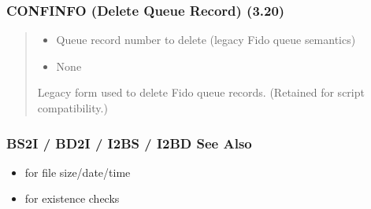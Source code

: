 \documentclass[letterpaper,10pt,english]{sphinxmanual}
\begin{document}
\subsubsection{CONFINFO (Delete Queue Record) (3.20)}
\label{\detokenize{ppl:id4}}\begin{quote}

\sphinxAtStartPar
{}
\begin{description}
\begin{itemize}
\item {} 
\sphinxAtStartPar
{} \textendash{} Queue record number to delete (legacy Fido queue semantics)

\end{itemize}

\begin{itemize}
\item {} 
\sphinxAtStartPar
None

\end{itemize}

\sphinxAtStartPar
Legacy form used to delete Fido queue records. (Retained for script compatibility.)

\end{description}

\sphinxAtStartPar
{}
\begin{quote}

\begin{sphinxVerbatim}[commandchars=\\\{\}]
  
\end{sphinxVerbatim}
\end{quote}
\end{quote}


\subsubsection{BS2I / BD2I / I2BS / I2BD See Also}
\label{\detokenize{ppl:bs2i-bd2i-i2bs-i2bd-see-also}}\begin{itemize}
\item {} 
\sphinxAtStartPar
{} for file size/date/time

\item {} 
\sphinxAtStartPar
{} for existence checks

\end{itemize}
\end{document}
